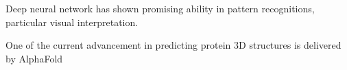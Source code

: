 Deep neural network has shown promising ability in pattern recognitions, particular visual interpretation.
\par 

One of the current advancement in predicting protein 3D structures is delivered by AlphaFold